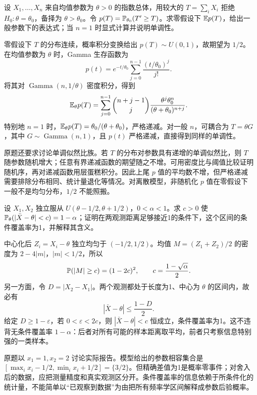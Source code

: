 \begin{example}[原题4：指数模型的平均 $p$ 值]\label{yau:2013-4}
设 $X_1,\ldots,X_n$ 来自均值参数为 $\theta>0$ 的指数总体，用较大的 $T=\sum_iX_i$ 拒绝 $H_0:\theta=\theta_0$，备择为 $\theta>\theta_0$。令 $p(T)=\mathbb P_{\theta_0}(T'\ge T)$。求零假设下 $\mathbb E p(T)$，给出一般参数下的表达式；当 $n=1$ 时显式计算并说明单调性。
\end{example}
\begin{solve}
零假设下 $T$ 的分布连续，概率积分变换给出 $p(T)\sim U(0,1)$，故期望为 $1/2$。在均值参数为 $\theta$ 时，Gamma 生存函数为
\[
p(t)=e^{-t/\theta_0}\sum_{j=0}^{n-1}\frac{(t/\theta_0)^j}{j!}.
\]
将其对 $\operatorname{Gamma}(n,1/\theta)$ 密度积分，得到
\[
\mathbb E_\theta p(T)=\sum_{j=0}^{n-1}\binom{n+j-1}{j}\frac{\theta^j\theta_0^n}{(\theta+\theta_0)^{n+j}}.
\]
特别地 $n=1$ 时，$\mathbb E_\theta p(T)=\theta_0/(\theta+\theta_0)$，严格递减。对一般 $n$，可耦合为 $T=\theta G$，其中 $G\sim\operatorname{Gamma}(n,1)$，且 $p(t)$ 严格递减，直接得到同样的单调性。

原题还要求讨论单调似然比族。若 $T$ 的分布对参数具有递增的单调似然比，则 $T$ 随参数随机增大；任意有界递减函数的期望随之不增。可用密度比与阈值比较证明随机序，再对递减函数用层蛋糕积分。因此上尾 $p$ 值的平均数不增，但严格递减需要排除分布相同、统计量退化等情况。对离散模型，非随机化 $p$ 值在零假设下一般不是均匀分布，$1/2$ 不能照搬。
\end{solve}

\begin{example}[原题5：均匀位置族的条件覆盖率]\label{yau:2013-5}
设 $X_1,X_2$ 独立服从 $U(\theta-1/2,\theta+1/2)$，$0<\alpha<1$。求 $c>0$ 使 $\mathbb P_\theta(|\bar X-\theta|<c)=1-\alpha$；证明在两观测距离足够接近1的条件下，这个区间的条件覆盖率为1，并解释其含义。
\end{example}
\begin{solve}
中心化后 $Z_i=X_i-\theta$ 独立均匀于 $(-1/2,1/2)$。均值 $M=(Z_1+Z_2)/2$ 的密度为 $2-4|m|$，$|m|<1/2$，所以
\[
\mathbb P(|M|\ge c)=(1-2c)^2,\qquad c=\frac{1-\sqrt\alpha}{2}.
\]
另一方面，令 $D=|X_2-X_1|$。两个观测都处于长度为1、中心为 $\theta$ 的区间内，故必有
\[
|\bar X-\theta|\le\frac{1-D}{2}.
\]
给定 $D\ge1-\varepsilon$，若 $0<\varepsilon<2c$，则 $|\bar X-\theta|<c$ 恒成立，条件覆盖率为1。这不违背无条件覆盖率 $1-\alpha$：后者对所有可能的样本距离取平均，前者只考察信息特别强的一类样本。

原题以 $x_1=1,x_2=2$ 讨论实际报告。模型给出的参数相容集合是 $[\max_i x_i-1/2,\min_i x_i+1/2]=\{3/2\}$。但精确差值为1是概率零事件；对舍入后的数据，应把测量精度和真实观测区分开。条件覆盖率的信息依赖于所条件化的统计量，不能简单以“已观察到数据”为由把所有频率学区间解释成参数后验概率。
\end{solve}

